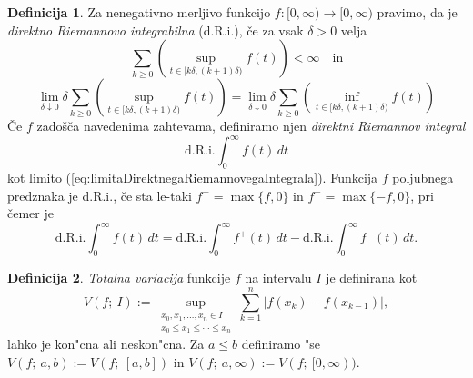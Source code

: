 \documentclass[12pt, a4paper, reqno]{amsart}
\theoremstyle{definition}
\newtheorem{definicija}{Definicija}[section]
\theoremstyle{plain}
\newtheorem{trditev}[definicija]{Trditev}
\newcommand{\1}{\mathds{1}}
\begin{document}
    \begin{definicija}
        Za nenegativno merljivo funkcijo \( f : [0, \infty) \to [0, \infty) \) pravimo, da je \textit{direktno 
        Riemannovo integrabilna} (d.R.i.), če za vsak $\delta > 0$ velja
        \begin{equation*}
            \sum_{k \geq 0} \left( \sup_{t \in [k\delta, (k+1)\delta)} f(t) \right) < \infty \quad \text{in}
        \end{equation*}
        \begin{equation}
             \lim_{\delta \downarrow 0} \delta \sum_{k \geq 0} \left( \sup_{t \in [k\delta, (k+1)\delta)} f(t) \right) = \lim_{\delta \downarrow 0} \delta \sum_{k \geq 0} \left( \inf_{t \in [k\delta, (k+1)\delta)} f(t) \right)
             \label{eq:limitaDirektnegaRiemannovegaIntegrala}
        \end{equation}
        Če \(f\) zadošča navedenima zahtevama, definiramo njen \textit{direktni Riemannov integral} 
        \[
        \text{d.R.i.} \int_{0}^{\infty} f(t) \, dt
        \]
        kot limito (\ref{eq:limitaDirektnegaRiemannovegaIntegrala}).
        Funkcija \(f\) poljubnega predznaka je d.R.i., če sta le-taki \(f^+ = \max\{f, 0\}\) in \(f^- = \max\{-f, 0\}\), pri čemer je
        \[
        \text{d.R.i.} \int_{0}^{\infty} f(t) \, dt = \text{d.R.i.} \int_{0}^{\infty} f^+(t) \, dt - \text{d.R.i.} \int_{0}^{\infty} f^-(t) \, dt.
        \]
        \label{def:direktnaRieamnovaIntegrabilnost}
    \end{definicija}

%

    \begin{definicija}
        \textit{Totalna variacija} funkcije $f$ na intervalu $I$ je definirana kot 
        $$
            V(f;\> I):= \sup\limits_{\substack{x_0, x_1, \dots, x_n \in I \\ x_0 \leq x_1 \leq \cdots \leq x_n}}\sum_{k=1}^{n}|f(x_k) - f(x_{k-1})|, 
        $$
        lahko je kon"cna ali neskon"cna. Za $a\leq b$ definiramo "se $V(f;\> a, b) := V(f;\> [a, b])$ in 
        $V(f;\> a, \infty) := V(f;\> [0, \infty))$.
        
        \label{def:totVariacija}
    \end{definicija}
\end{document}
